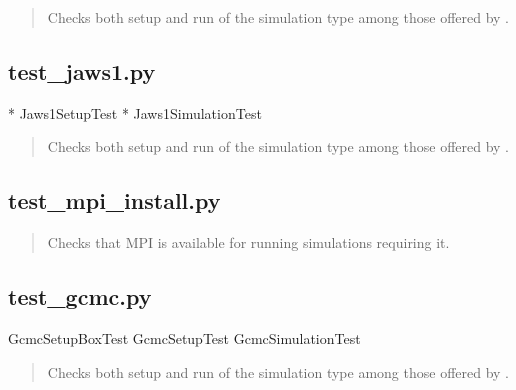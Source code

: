 \documentclass[letterpaper,10pt,english]{sphinxmanual}
\begin{document}
\begin{quote}

Checks both setup and run of the  simulation type among those offered by .
\end{quote}

\begin{quote}

\end{quote}


\subsection{test\_jaws1.py}
\label{\detokenize{testsuite:test-jaws1-py}}
* Jaws1SetupTest
* Jaws1SimulationTest

\begin{quote}

Checks both setup and run of the  simulation type among those offered by .
\end{quote}

\begin{quote}

\end{quote}


\subsection{test\_mpi\_install.py}
\label{\detokenize{testsuite:test-mpi-install-py}}
\begin{quote}

Checks that MPI is available for running simulations requiring it.
\end{quote}


\subsection{test\_gcmc.py}
\label{\detokenize{testsuite:test-gcmc-py}}
GcmcSetupBoxTest
GcmcSetupTest
GcmcSimulationTest

\begin{quote}

Checks both setup and run of the  simulation type among those offered by .
\end{quote}
\end{document}
